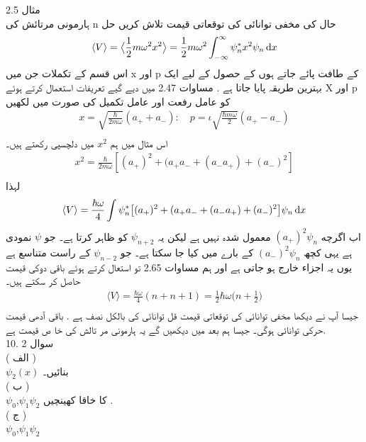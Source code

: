\documentclass{book}
\begin{document}
مثال
2.5\\
ہارمونی مرتائش کی
n
حال کی مخفی توانائی کی توقعاتی قیمت تلاش کریں
حل
\begin{align*}
\langle V  \rangle =\big\langle\frac{1}{2}m\omega ^{2}x^{2}\big\rangle=\frac{1}{2}m\omega ^{2}\int_{-\infty}^{\infty}\psi_{n}^{*}x^{2}\psi_{n}\dif{x}\\
\end{align*}
اس قسم کے تکملات جن میں
x
اور
p
کے طافت پائے جاتے ہوں کے حصول کے لیے ایک بہترین طریقہ پایا جاتا ہے .
مساوات
2.47
میں دیے گیے تعریفات استعمال کرتے ہوئے
X
اور
p
کو عامل رفعت اور عامل تکمیل کی صورت میں لکھیں
\begin{align*}
x=\sqrt{\frac{\hbar}{2m\omega}}(a_{+}+a_{-}):\quad p=\iota\sqrt{\frac{\hbar m\omega}{2}}(a_{+}-a_{-})\\
\end{align*}
اس مثال میں ہم
\(x^{2}\)
میں دلچسپی رکھتے ہیں۔
\begin{align*}
x^{2}=\frac{\hbar}{2m\omega}[(a_{+})^{2}+(a_{+}a_{-}+(a_{-}a_{+})+(a_{-})^{2}] \\
\end{align*}
لہذا
\begin{align*}
\langle V \rangle =\frac{\hbar\omega}{4}\int \psi_{n}^{*}\big[(a_{+})^{2}+(a_{+}a_{-}+(a_{-}a_{+})+(a_{-})^{2}\big ]\psi_{n}\dif{x}\\
\end{align*}
اب اگرچه
\((a_{+})^{2}\psi_{n}\)
معمول شدہ نہیں ہے لیکن یہ
\(\psi_{n+2}\)
کو ظاہر کرتا ہے۔ جو
\(\psi\)
نمودی ہے یہی کچھ
\((a_{-})^{2}\psi_{n}\)
کے بارے میں کیا جا سکتا ہے۔ جو
\(\psi_{n-2}\)
کے راست متناسع ہے یوں یہ اجزاء خارج ہو جاتی ہے اور ہم مساوات
2.65
تو استعال کرتے ہوئے باقی دوکی قیمت حاصل کر سکتے ہیں۔
\begin{align*}
\langle V \rangle =\frac{\hbar\omega}{4}(n+n+1)=\frac{1}{2}\hbar\omega\big (n+\frac{1}{2} \big )\\
\end{align*}
جیسا آپ نے دیکھا مخفی توانائی کی توقعاتی قیمت قل توانائی کی بالکل نصف ہے . باقی آدھی قیمت حرکی توانائی ہوگی۔ جیسا ہم بعد میں دیکھیں گے یہ ہارمونی مر تالش کی خا ص قیمت ہے.\\
سوال
2 .10\\
( الف )\\
\(\psi_{2}(x)\)
بنائیں۔\\
( ب )\\
\(\psi_{0}\),\(\psi_{1}\)\(\psi_{2}\)
کا خاقا کھینچیں .\\
( ج )\\
\(\psi_{0}\),\(\psi_{1}\)\(\psi_{2}\)
\end{document}
